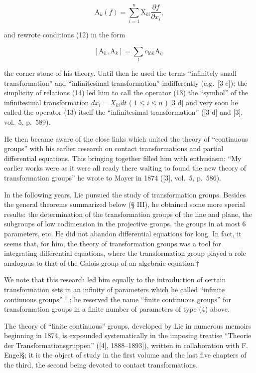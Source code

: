 \[
\mathrm{A} _ {k} (f) = \sum_ {i = 1} ^ {n} \mathrm{X} _ {k i} \frac {\partial f}{\partial x _ {i}},\tag{13}
\]

and rewrote conditions (12) in the form

\[
[ \mathrm{A} _ {h}, \mathrm{A} _ {k} ] = \sum_ {l} c _ {l h k} \mathrm{A} _ {l},\tag{14}
\]

the corner stone of his theory. Until then he used the terms ``infinitely small transformation'' and ``infinitesimal transformation'' indifferently (e.g.~{[}3 e{]}); the simplicity of relations (14) led him to call the operator (13) the ``symbol'' of the infinitesimal transformation \(dx_{i} = X_{ki}dt\) ( \(1 \leqslant i \leqslant n\) ) {[}3 d{]} and very soon he called the operator (13) itself the ``infinitesimal transformation'' ({[}3 d{]} and {[}3{]}, vol.~5, p.~589).

He then became aware of the close links which united the theory of ``continuous groups'' with his earlier research on contact transformations and partial differential equations. This bringing together filled him with enthusiasm: ``My earlier works were as it were all ready there waiting to found the new theory of transformation groups'' he wrote to Mayer in 1874 ({[}3{]}, vol.~5, p.~586).

In the following years, Lie pursued the study of transformation groups. Besides the general theorems summarized below (§ III), he obtained some more special results: the determination of the transformation groups of the line and plane, the subgroups of low codimension in the projective groups, the groups in at most 6 parameters, etc. He did not abandon differential equations for long. In fact, it seems that, for him, the theory of transformation groups was a tool for integrating differential equations, where the transformation group played a role analogous to that of the Galois group of an algebraic equation.†

We note that this research led him equally to the introduction of certain transformation sets in an infinity of parameters which he called ``infinite continuous groups'' \(^{‡}\) ; he reserved the name ``finite continuous groups'' for transformation groups in a finite number of parameters of type (4) above.


The theory of ``finite continuous'' groups, developed by Lie in numerous memoirs beginning in 1874, is expounded systematically in the imposing treatise ``Theorie der Transformationsgruppen'' ({[}4{]}, 1888--1893{]}), written in collaboration with F. Engel§; it is the object of study in the first volume and the last five chapters of the third, the second being devoted to contact transformations.

